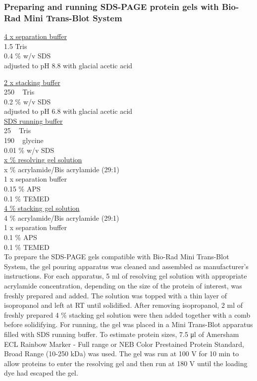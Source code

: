 
\subsubsection{Preparing and running SDS-PAGE protein gels with Bio-Rad Mini Trans-Blot System}

\underline{4 x separation buffer}\\
1.5 \si{\Molar} Tris\\
0.4 \% w/v SDS\\
adjusted to pH 8.8 with glacial acetic acid

\underline{2 x stacking buffer}\\
250 \si{\milli\Molar} Tris\\
0.2 \% w/v SDS\\
adjusted to pH 6.8 with glacial acetic acid\\

\underline{SDS running buffer}\\
25 \si{\milli\Molar} Tris\\
190 \si{\milli\Molar} glycine\\
0.01 \% w/v SDS\\

\underline{x \% resolving gel solution}\\
x \% acrylamide/Bis acrylamide (29:1)\\
1 x separation buffer\\
0.15 \% APS\\
0.1 \% TEMED\\

\underline{4 \% stacking gel solution}\\
4 \% acrylamide/Bis acrylamide (29:1)\\
1 x separation buffer\\
0.1 \% APS\\
0.1 \% TEMED\\

To prepare the SDS-PAGE gels compatible with Bio-Rad Mini Trans-Blot System, the gel pouring apparatus was cleaned and assembled as manufacturer's instructions. For each apparatus, 5 \si{\milli\litre} of resolving gel solution with appropriate acrylamide concentration, depending on the size of the protein of interest, was freshly prepared and added. The solution was topped with a thin layer of isopropanol and left at RT until solidified. After removing isopropanol, 2 \si{\milli\litre} of freshly prepared 4 \% stacking gel solution were then added together with a comb before solidifying. For running, the gel was placed in a Mini Trans-Blot apparatus filled with SDS running buffer. To estimate protein sizes, 7.5 \si{\micro\litre} of Amersham ECL Rainbow Marker - Full range or NEB Color Prestained Protein Standard, Broad Range (10-250 kDa) was used. The gel was run at 100 \si{\volt} for 10 \si{\minute} to allow proteins to enter the resolving gel and then run at 180 \si{\volt} until the loading dye had escaped the gel. 

